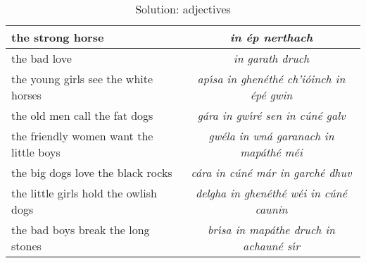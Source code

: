\begin{table}[H]
{\begin{tabular}{|l|>{\itshape}c|}
    the strong horse & in \'{e}p nerthach\\
    \midrule
    the bad love & in garath druch\\
    \midrule
    the young girls see the white horses & ap\'{\i}sa in ghen\'{e}th\'{e} ch'i\'{o}inch in \'{e}p\'{e} gwin\\
    \midrule
    the old men call the fat dogs & g\'{a}ra in gw\'{\i}r\'{e} sen in c\'{u}n\'{e} galv\\
    \midrule
    the friendly women want the little boys & gw\'{e}la in wn\'{a} garanach in map\'{a}th\'{e} m\'{e}i\\
    \midrule
    the big dogs love the black rocks & c\'{a}ra in c\'{u}n\'{e} m\'{a}r in garch\'{e} dhuv\\
    \midrule
    the little girls hold the owlish dogs & delgha in ghen\'{e}th\'{e} w\'{e}i in c\'{u}n\'{e} caunin\\
    \midrule
    the bad boys break the long stones & br\'{\i}sa in map\'{a}the druch in achaun\'{e} s\'{\i}r\\
    \bottomrule
  \end{tabular}
}
\label{solution_adjectives}
\caption{Solution: adjectives}
\end{table}
